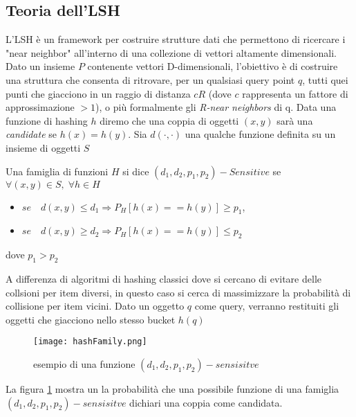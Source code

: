 \subsection{Teoria dell'LSH}
 L'LSH è un framework per costruire strutture dati che permettono di ricercare i "near neighbor" all'interno di una collezione di vettori altamente dimensionali.  Dato un insieme $P$ contenente vettori D-dimensionali, l'obiettivo è di costruire una struttura che consenta di ritrovare, per un qualsiasi query point $q$, tutti quei punti che giacciono in un raggio di distanza $cR$ (dove $c$ rappresenta un fattore di approssimazione $>1$), o più formalmente gli \emph{R-near neighbors} di q.
 Data una funzione di hashing $h$ diremo che una coppia di oggetti $(x,y)$ sarà una \emph{candidate}   se $h(x)=h(y)$. Sia $d(\cdot,\cdot)$ una qualche funzione  definita su un insieme di oggetti $S$
\begin{definizione} 

Una famiglia di funzioni $H$ si dice $(d_1,d_2,p_1,p_2)-Sensitive$ se  $\forall (x,y) \in S ,\;\forall h \in H $ 


\begin{itemize}
\item $se \quad  d(x,y)\leq d_1 \Rightarrow P_H[h(x)==h(y)]\geq p_1  $,
\item $se \quad  d(x,y)\geq d_2 \Rightarrow P_H[h(x)==h(y)]\leq p_2  $
\end{itemize}
dove $p_1>p_2$
\end{definizione}
A differenza di algoritmi di hashing classici dove si cercano di evitare delle collsioni per item diversi, in questo caso si cerca di massimizzare la probabilità di collisione per item vicini.
Dato un oggetto $q$ come query, verranno restituiti gli oggetti che giacciono nello stesso bucket $h(q)$
 

\begin{figure}[h]
\centering
\texttt{[image: hashFamily.png]}
\caption{esempio di una funzione $(d_1,d_2,p_1,p_2)-sensisitve$}
\label{fig:lshfamily}
\end{figure} 
 
La figura \ref{fig:lshfamily} mostra un la probabilità che una possibile funzione di una famiglia  $(d_1,d_2,p_1,p_2)-sensisitve$ dichiari una coppia come candidata.

